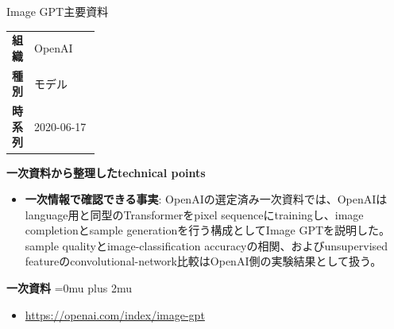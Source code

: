 \begin{technicalnote}{Image GPT}{主要資料}
\begingroup
\begin{tabularx}{\linewidth}{@{}>{\bfseries}p{0.22\linewidth}X@{}}
組織 & OpenAI \\
種別 & モデル \\
時系列 & 2020-06-17 \\
\end{tabularx}
\smallskip
{\bfseries 一次資料から整理したtechnical points}
\begin{itemize}[leftmargin=1.5em,itemsep=0.35em]
\item \textbf{一次情報で確認できる事実}: OpenAIの選定済み一次資料では、OpenAIはlanguage用と同型のTransformerをpixel sequenceにtrainingし、image completionとsample generationを行う構成としてImage GPTを説明した。 sample qualityとimage-classification accuracyの相関、およびunsupervised featureのconvolutional-network比較はOpenAI側の実験結果として扱う。
\end{itemize}
\begin{minipage}{\linewidth}
\begin{samepage}
{\bfseries 一次資料}
\begingroup\sloppy
\Urlmuskip=0mu plus 2mu\relax
\begin{itemize}[leftmargin=1.5em,itemsep=0.25em]
\item {\scriptsize\url{https://openai.com/index/image-gpt}}
\end{itemize}
\endgroup
\end{samepage}
\end{minipage}
\endgroup
\end{technicalnote}
\medskip

